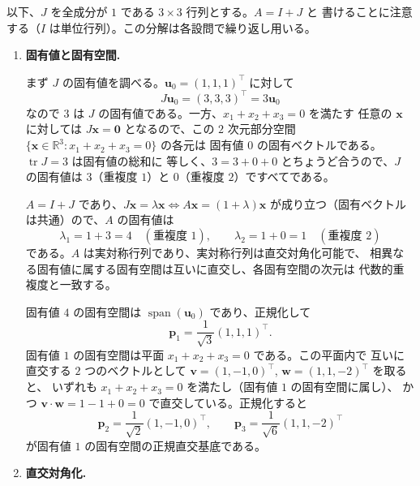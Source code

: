 
以下、$J$ を全成分が $1$ である $3 \times 3$ 行列とする。$A = I + J$ と
書けることに注意する（$I$ は単位行列）。この分解は各設問で繰り返し用いる。

\begin{enumerate}
  \item \textbf{固有値と固有空間.}

    まず $J$ の固有値を調べる。$\bm{u}_0 = (1,1,1)^{\top}$ に対して
    \[
      J\bm{u}_0 = (3,3,3)^{\top} = 3\bm{u}_0
    \]
    なので $3$ は $J$ の固有値である。一方、$x_1+x_2+x_3=0$ を満たす
    任意の $\bm{x}$ に対しては $J\bm{x} = \bm{0}$ となるので、この
    $2$ 次元部分空間 $\{\bm{x}\in\mathbb{R}^3 : x_1+x_2+x_3=0\}$ の各元は
    固有値 $0$ の固有ベクトルである。$\operatorname{tr} J = 3$ は固有値の総和に
    等しく、$3 = 3 + 0 + 0$ とちょうど合うので、$J$ の固有値は
    $3$（重複度 $1$）と $0$（重複度 $2$）ですべてである。

    $A = I + J$ であり、$J\bm{x} = \lambda\bm{x} \iff A\bm{x} = (1+\lambda)\bm{x}$
    が成り立つ（固有ベクトルは共通）ので、$A$ の固有値は
    \[
      \lambda_1 = 1+3 = 4 \quad (\text{重複度 } 1), \qquad
      \lambda_2 = 1+0 = 1 \quad (\text{重複度 } 2)
    \]
    である。$A$ は実対称行列であり、実対称行列は直交対角化可能で、
    相異なる固有値に属する固有空間は互いに直交し、各固有空間の次元は
    代数的重複度と一致する。

    固有値 $4$ の固有空間は $\operatorname{span}(\bm{u}_0)$ であり、正規化して
    \[
      \bm{p}_1 = \frac{1}{\sqrt{3}}(1,1,1)^{\top}.
    \]
    固有値 $1$ の固有空間は平面 $x_1+x_2+x_3=0$ である。この平面内で
    互いに直交する $2$ つのベクトルとして
    $\bm{v} = (1,-1,0)^{\top}$, $\bm{w} = (1,1,-2)^{\top}$ を取ると、
    いずれも $x_1+x_2+x_3=0$ を満たし（固有値 $1$ の固有空間に属し）、
    かつ $\bm{v}\cdot\bm{w} = 1 - 1 + 0 = 0$ で直交している。正規化すると
    \[
      \bm{p}_2 = \frac{1}{\sqrt{2}}(1,-1,0)^{\top}, \qquad
      \bm{p}_3 = \frac{1}{\sqrt{6}}(1,1,-2)^{\top}
    \]
    が固有値 $1$ の固有空間の正規直交基底である。

  \item \textbf{直交対角化.}


\end{enumerate}
